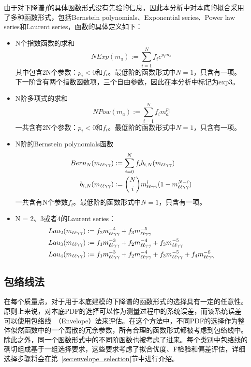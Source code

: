 由于对下降谱$f$的具体函数形式没有先验的信息，因此本分析中对本底的拟合采用了多种函数形式，包括Bernstein polynomials、Exponential series、Power law series和Laurent series，函数的具体定义如下：
\begin{itemize}
  \item N个指数函数的求和
    \begin{equation}
    NExp(m_{a}) := \sum_{i=1}^{N} f_{i}e^{p_{i}m_{a}}
    \end{equation}
    其中包含2N个参数：$p_{i} < 0$和$f_{i}$。最低阶的函数形式中$N = 1$，只含有一项。下一阶含有两个指数函数项，三个自由参数，因此在本分析中标记为exp3。
  \item N阶多项式的求和
    \begin{equation}
    NPow(m_{a}) := \sum_{i=1}^{N} f_{i}m_{a}^{p_{i}}
    \end{equation}
    一共含有2N个参数：$p_{i} < 0$和$f_{i}$。最低阶的函数形式中$N = 1$，只含有一项。
  \item N阶的Bernstein polynomials函数
    \begin{equation}
      \begin{split}
        Bern_{N}(m_{\ell\ell\gamma\gamma}) &:= \sum_{i=0}^{N} f_{i}b_{i,N}(m_{\ell\ell\gamma\gamma})\\
        b_{i,N}(m_{\ell\ell\gamma\gamma}) &:= {N \choose i} m_{\ell\ell\gamma\gamma}^{i}(1-m_{\ell\ell\gamma\gamma}^{N-i})
      \end{split}
    \end{equation}
    一共含有N个参数$f_{i}$。最低阶的函数形式中$N = 1$，只含有一项。
  \item N = 2、3或者4的Laurent series：
    \begin{equation}
      \begin{split}
      Lau_{2}(m_{\ell\ell\gamma\gamma}) &:= f_{2}m_{\ell\ell\gamma\gamma}^{-4} + f_{3}m_{\ell\ell\gamma\gamma}^{-5}\\
      Lau_{3}(m_{\ell\ell\gamma\gamma}) &:= f_{1}m_{\ell\ell\gamma\gamma}^{-3} + f_{2}m_{\ell\ell\gamma\gamma}^{-4} + f_{3}m_{\ell\ell\gamma\gamma}^{-5}\\
      Lau_{4}(m_{\ell\ell\gamma\gamma}) &:= f_{1}m_{\ell\ell\gamma\gamma}^{-3} + f_{2}m_{\ell\ell\gamma\gamma}^{-4} + f_{3}m_{\ell\ell\gamma\gamma}^{-5} + f_{4}m_{\ell\ell\gamma\gamma}^{-6}
      \end{split}
    \end{equation}
\end{itemize}

\subsection{包络线法}\label{sec:envelop_method}

在每个质量点，对于用于本底建模的下降谱的函数形式的选择具有一定的任意性。原则上来说，对本底PDF的选择可以作为测量过程中的系统误差，而该系统误差可以使用包络线~\cite{DiscreteProfilingMethod}（Envelope）法来评估。在这个方法中，不同PDF的选择作为整体似然函数中的一个离散的冗余参数，所有合理的函数形式都被考虑到包络线中。除此之外，同一个函数形式中的不同阶函数也被考虑了进来。每个类别中包络线的确切组成基于一组选择要求，这些要求考虑了拟合优度、F检验和偏差评估，详细选择步骤将会在第~\ref{sec:envelope_selection}节中进行介绍。

